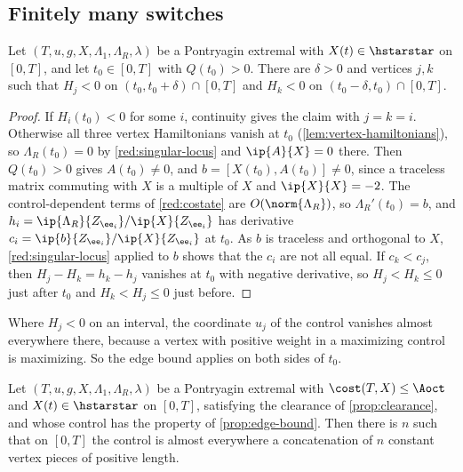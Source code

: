 \subsection{Finitely many switches}\label{red:switch-sec}

\begin{lemma}\label{red:local-exclusion}
Let $(T,u,g,X,\Lambda_1,\Lambda_R,\lambda)$ be a Pontryagin extremal with $X(t)\in\hstarstar$ on
$[0,T]$, and let $t_0\in[0,T]$ with $Q(t_0)>0$. There are $\delta>0$ and vertices $j,k$ such that
$H_j<0$ on $(t_0,t_0+\delta)\cap[0,T]$ and $H_k<0$ on $(t_0-\delta,t_0)\cap[0,T]$.
\end{lemma}

\begin{proof}
If $H_i(t_0)<0$ for some $i$, continuity gives the claim with $j=k=i$. Otherwise all three vertex
Hamiltonians vanish at $t_0$ (\cref{lem:vertex-hamiltonians}), so $\Lambda_R(t_0)=0$ by
\cref{red:singular-locus} and $\ip{A}{X}=0$ there. Then $Q(t_0)>0$ gives $A(t_0)\ne0$, and
$b=[X(t_0),A(t_0)]\ne0$, since a traceless matrix commuting with $X$ is a multiple of $X$ and
$\ip{X}{X}=-2$. The control-dependent terms of \cref{red:costate} are $O(\norm{\Lambda_R})$, so
$\Lambda_R'(t_0)=b$, and $h_i=\ip{\Lambda_R}{Z_{\ee_i}}/\ip{X}{Z_{\ee_i}}$ has derivative
$c_i=\ip{b}{Z_{\ee_i}}/\ip{X}{Z_{\ee_i}}$ at $t_0$. As $b$ is traceless and orthogonal to $X$,
\cref{red:singular-locus} applied to $b$ shows that the $c_i$ are not all equal. If $c_k<c_j$, then
$H_j-H_k=h_k-h_j$ vanishes at $t_0$ with negative derivative, so $H_j<H_k\le0$ just after $t_0$ and
$H_k<H_j\le0$ just before.
\end{proof}

Where $H_j<0$ on an interval, the coordinate $u_j$ of the control vanishes almost everywhere there,
because a vertex with positive weight in a maximizing control is maximizing. So the edge bound applies on both sides of $t_0$.

\begin{proposition}\label{prop:finite-switches}
Let $(T,u,g,X,\Lambda_1,\Lambda_R,\lambda)$ be a Pontryagin extremal with $\cost(T,X)\le\Aoct$ and
$X(t)\in\hstarstar$ on $[0,T]$, satisfying the clearance of \cref{prop:clearance}, and whose control
has the property of \cref{prop:edge-bound}. Then there is $n$ such that on $[0,T]$ the control is
almost everywhere a concatenation of $n$ constant vertex pieces of positive length.
\end{proposition}

